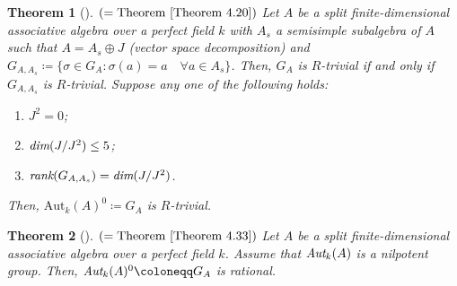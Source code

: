 \documentclass[12pt]{amsart}
\newtheorem{thmI}{Theorem}
\theoremstyle{definition}
\numberwithin{equation}{section}
\begin{document}
\begin{thmI}[]
$(=\text{Theorem }\ref{Theorem 4.20})$
Let $A$ be a split finite-dimensional associative algebra over a perfect field $k$ with $A_s$ a semisimple subalgebra of $A$ such that $A= A_s\oplus J$ (vector space decomposition) and $G_{A, A_s}\coloneqq\{\sigma\in G_A: \sigma(a)=a \quad \forall a\in A_s\}$. Then, $G_A$ is $R$-trivial if and only if $G_{A,A_s}$ is $R$-trivial. Suppose any one of the following holds:
\begin{enumerate}
    \item $J^2=0$;
    \vskip2mm
    \item $\emph{dim}(J/J^2)\leq 5$;
    \vskip2mm
    \item $\emph{rank} (G_{A,A_s})=\emph{dim}(J/J^2)$.
\end{enumerate}
\vskip2mm
 Then, $\mathrm{Aut}_k(A)^{0}\coloneqq G_A$ is $R$-trivial.
\end{thmI}
\vskip2mm

\begin{thmI}[]
$(=\text{Theorem }\ref{Theorem 4.33})$ Let $A$ be a split finite-dimensional associative algebra over a perfect field $k$. Assume that $\emph{\text{Aut}}_k(A)$ is a nilpotent group. Then, $\emph{\text{Aut}}_k(A)^{0}\coloneqq  G_A$ is rational.
\end{thmI}
\end{document}
